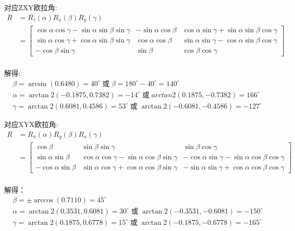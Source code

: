 \documentclass[UTF8, 12pt]{ctexart}
\begin{document}
对应ZXY欧拉角:
\[
\begin{aligned}
    R &= R_z(\alpha) R_x(\beta) R_y(\gamma) \\
        &= \begin{bmatrix}
                \cos\alpha \cos\gamma - \sin\alpha \sin\beta \sin\gamma & -\sin\alpha \cos\beta & \cos\alpha \sin\gamma + \sin\alpha \sin\beta \cos\gamma \\
                \sin\alpha \cos\gamma + \cos\alpha \sin\beta \sin\gamma & \cos\alpha \cos\beta & \sin\alpha \sin\gamma - \cos\alpha \sin\beta \cos\gamma \\
                -\cos\beta \sin\gamma & \sin\beta & \cos\beta \cos\gamma
            \end{bmatrix} \\
\end{aligned}
\]

解得:
\[
\begin{aligned}
    &\beta = \arcsin(0.6480) = 40^\circ \; \text{或} \; \beta = 180^\circ - 40^\circ = 140^\circ \\
    &\alpha = \arctan2(-0.1875, 0.7382) = -14^\circ \; \text{或} \; arctan2(0.1875, -0.7382) = 166^\circ \\
    &\gamma = \arctan2(0.6081, 0.4586) = 53^\circ \; \text{或} \; \arctan2(-0.6081, -0.4586) = -127^\circ
\end{aligned}
\]
\vspace{1em}

对应XYX欧拉角:
\[
\begin{aligned}
    R &= R_x(\alpha) R_y(\beta) R_x(\gamma) \\
        &=  \begin{bmatrix}
                \cos\beta & \sin\beta \sin\gamma & \sin\beta \cos\gamma \\
                \sin\alpha \sin\beta & \cos\alpha \cos\gamma - \sin\alpha \cos\beta \sin\gamma & -\cos\alpha \sin\gamma - \sin\alpha \cos\beta \cos\gamma \\
                -\cos\alpha \sin\beta & \sin\alpha \cos\gamma + \cos\alpha \cos\beta \sin\gamma & -\sin\alpha \sin\gamma + \cos\alpha \cos\beta \cos\gamma
            \end{bmatrix} \\
\end{aligned}
\]

解得：
\[
\begin{aligned}
    &\beta = \pm \arccos(0.7110) = 45^\circ \\
    &\alpha = \arctan2(0.3531, 0.6081) = 30^\circ \; \text{或} \; \arctan2(-0.3531, -0.6081) = -150^\circ \\
    &\gamma = \arctan2(0.1875, 0.6778) = 15^\circ \; \text{或} \; \arctan2(-0.1875, -0.6778) = -165^\circ
\end{aligned}
\]
\vspace{1em}
\end{document}
